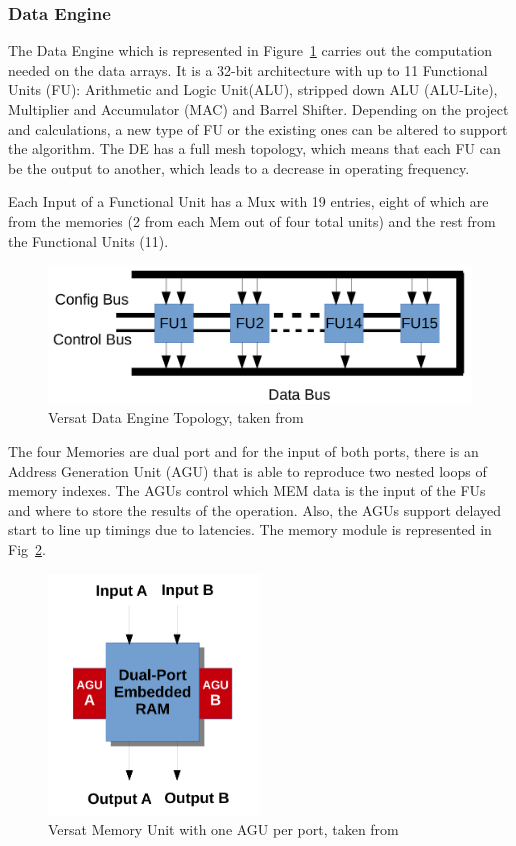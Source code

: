 \subsubsection{Data Engine}
\quad The Data Engine which is represented in Figure~\ref{figure:DE} carries out the computation needed on the data arrays. It is a 32-bit architecture with up to 11 Functional Units (FU):
 Arithmetic and Logic Unit(ALU), stripped down ALU (ALU-Lite),
 Multiplier and Accumulator (MAC) and Barrel Shifter.
 Depending on the project and calculations, a new type of FU or the existing ones can be altered to support the algorithm.
 The DE has a full mesh topology, which means that each FU can be the output to another, which leads to a decrease in operating frequency.

 Each Input of a Functional Unit has a Mux with 19 entries, eight of which are from the memories (2 from each Mem out of four total units) and the rest from the Functional Units (11).

 \begin{figure}[!htbp]
    \centering
    \includegraphics[width=1\textwidth]{Figures/de.png}
    \caption{Versat Data Engine Topology, taken from~\cite{sousa:FFT}}
    \label{figure:DE}
\end{figure} 

 The four Memories are dual port and for the input of both ports, 
 there is an Address Generation Unit (AGU) that is able to 
 reproduce two nested loops of memory indexes.
 The AGUs control which MEM data is the input of the FUs and where
 to store the results of the operation. Also, the AGUs support delayed start to line up timings
due to latencies. The memory module is represented in Fig~\ref{figure:FU}.

\begin{figure}[!htbp]
    \centering
    \includegraphics[width=0.5\textwidth]{Figures/fu2.pdf}
    \caption{Versat Memory Unit with one AGU per port, taken from~\cite{lopes:Versat}}
    \label{figure:FU}
\end{figure} 

